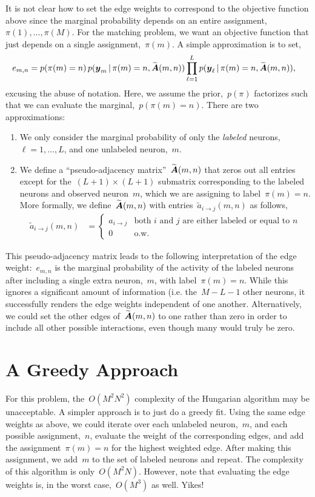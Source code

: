 It is not clear how to set the edge weights to correspond to the
objective function above since the marginal probability depends
on an entire assignment,~$\pi(1), \ldots, \pi(M)$. For the matching
problem, we want an objective function that just depends on a single
assignment,~$\pi(m)$. A simple approximation is to set,
\begin{align*}
  e_{m,n} &= p(\pi(m)=n) \, p(\boldsymbol{y}_m \, | \, \pi(m)=n, \widetilde{\boldsymbol{A}}(m,n)) \prod_{\ell = 1}^L p(\boldsymbol{y}_\ell \, | \, \pi(m)=n, \widetilde{\boldsymbol{A}}(m,n)),
\end{align*}
excusing the abuse of notation.
Here, we assume the prior,~$p(\pi)$ factorizes such that we can evaluate
the marginal,~$p(\pi(m)=n)$. There are two approximations:
\begin{enumerate}
\item We only consider the marginal probability of only the \emph{labeled}
neurons,~$\ell=1, \ldots, L$, and one unlabeled neuron,~$m$.

\item We define a ``pseudo-adjacency matrix''~$\widetilde{\boldsymbol{A}}(m,n)$
that zeros out all entries except for the~$(L+1) \times (L+1)$ submatrix
corresponding to the labeled neurons and observed neuron~$m$, which we
are assigning to label~$\pi(m)=n$. More formally, we define~$\widetilde{\boldsymbol{A}}(m,n)$
with entries~$\widetilde{a}_{i \to j}(m,n)$ as follows,
\begin{align*}
  \widetilde{a}_{i \to j}(m,n) &=
  \begin{cases}
    a_{i \to j}  & \text{both $i$ and~$j$ are either labeled or equal to~$n$} \\ 
    0 & \text{o.w.}
  \end{cases}
\end{align*}
\end{enumerate}

This pseudo-adjacency matrix leads to the following interpretation of the edge
weight:~$e_{m,n}$ is the marginal probability of the activity of the labeled neurons
after including a single extra neuron,~$m$, with label~$\pi(m)=n$. While this
ignores a significant amount of information (i.e. the~$M-L-1$ other neurons, it
successfully renders the edge weights independent of one another. Alternatively,
we could set the other edges of~$\widetilde{\boldsymbol{A}}(m,n)$ to one rather than
zero in order to include all other possible interactions, even though many
would truly be zero.

\section{A Greedy Approach}
For this problem, the~$O(M^2 N^2)$ complexity of the Hungarian algorithm
may be unacceptable. A simpler approach is to just do a greedy fit. Using
the same edge weights as above, we could iterate over each unlabeled
neuron,~$m$, and each possible assignment,~$n$, evaluate the weight
of the corresponding edges, and add the assignment~$\pi(m)=n$ for the
highest weighted edge. After making this assignment, we add~$m$ to the
set of labeled neurons and repeat. The complexity of this algorithm
is only~$O(M^2 N)$. However, note that evaluating the edge weights
is, in the worst case,~$O(M^3)$ as well. Yikes! 

